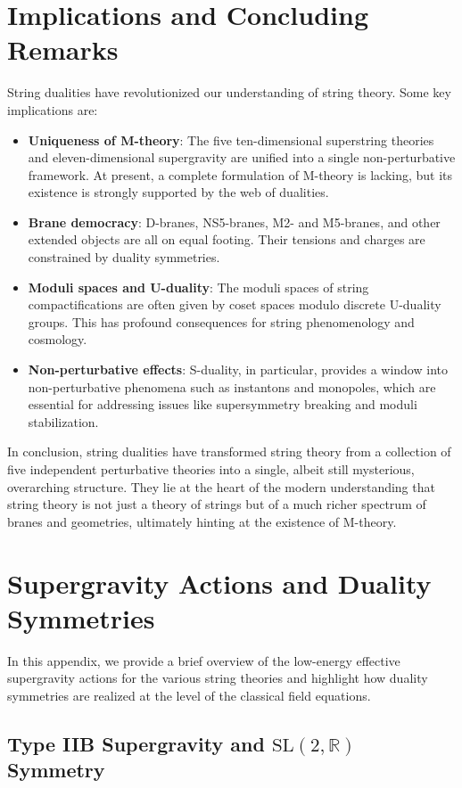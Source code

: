 \documentclass[11pt]{article}
\begin{document}
\section{Implications and Concluding Remarks}
String dualities have revolutionized our understanding of string theory. Some key implications are:
\begin{itemize}
    \item \textbf{Uniqueness of M-theory}: The five ten-dimensional superstring theories and eleven-dimensional supergravity are unified into a single non-perturbative framework. At present, a complete formulation of M-theory is lacking, but its existence is strongly supported by the web of dualities.
    \item \textbf{Brane democracy}: D-branes, NS5-branes, M2- and M5-branes, and other extended objects are all on equal footing. Their tensions and charges are constrained by duality symmetries.
    \item \textbf{Moduli spaces and U-duality}: The moduli spaces of string compactifications are often given by coset spaces modulo discrete U-duality groups. This has profound consequences for string phenomenology and cosmology.
    \item \textbf{Non-perturbative effects}: S-duality, in particular, provides a window into non-perturbative phenomena such as instantons and monopoles, which are essential for addressing issues like supersymmetry breaking and moduli stabilization.
\end{itemize}

In conclusion, string dualities have transformed string theory from a collection of five independent perturbative theories into a single, albeit still mysterious, overarching structure. They lie at the heart of the modern understanding that string theory is not just a theory of strings but of a much richer spectrum of branes and geometries, ultimately hinting at the existence of M-theory.

\appendix
\section{Supergravity Actions and Duality Symmetries}

In this appendix, we provide a brief overview of the low-energy effective supergravity actions for the various string theories and highlight how duality symmetries are realized at the level of the classical field equations.

\subsection{Type IIB Supergravity and $\mathrm{SL}(2,\mathbb{R})$ Symmetry}
\end{document}
